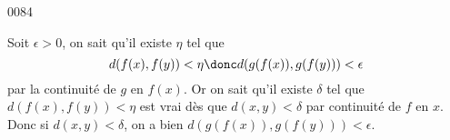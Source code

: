 
\begin{corrige}{0084}


Soit $\epsilon > 0$, on sait qu'il existe $\eta$ tel que
\[
	d(f(x),f(y)) < \eta \donc d(g(f(x)),g(f(y))) < \epsilon
\]
par la continuité de $g$ en $f(x)$. Or on sait qu'il existe $\delta$ tel que $d(f(x),f(y)) < \eta$ est vrai dès que $d(x,y) < \delta$ par continuité de $f$ en $x$.  Donc si $d(x,y) < \delta$, on a bien $d(g(f(x)),g(f(y)))<\epsilon$.

\end{corrige}
